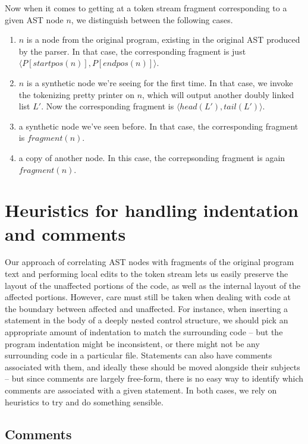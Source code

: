 Now when it comes to getting at a token stream fragment corresponding to a
given AST node $n$, we distinguish between the following cases.

\begin{enumerate}
  \item $n$ is a node from the original program, existing in the original
    AST produced by the parser. In that case, the corresponding fragment
    is just $\langle P[startpos(n)], P[endpos(n)] \rangle$.
  \item $n$ is a synthetic node we're seeing for the first time. In that case,
    we invoke the tokenizing pretty printer on $n$, which will output another
    doubly linked list $L'$. Now the corresponding fragment is
    $\langle head(L'), tail(L') \rangle$.
  \item a synthetic node we've seen before. In that case, the corresponding
    fragment is $fragment(n)$.
  \item a copy of another node. In this case, the correpsonding fragment is
    again $fragment(n)$.
\end{enumerate}

\section{Heuristics for handling indentation and comments}

Our approach of correlating AST nodes with fragments of the original program
text and performing local edits to the token stream lets us easily preserve the
layout of the unaffected portions of the code, as well as the internal layout
of the affected portions. However, care must still be taken when dealing with
code at the boundary between affected and unaffected. For instance, when
inserting a statement in the body of a deeply nested control structure, we
should pick an appropriate amount of indentation to match the surrounding code
-- but the program indentation might be inconsistent, or there might not be any
surrounding code in a particular file. Statements can also have comments
associated with them, and ideally these should be moved alongside their
subjects -- but since comments are largely free-form, there is no easy way to
identify which comments are associated with a given statement. In both cases,
we rely on heuristics to try and do something sensible.

\subsection{Comments}

